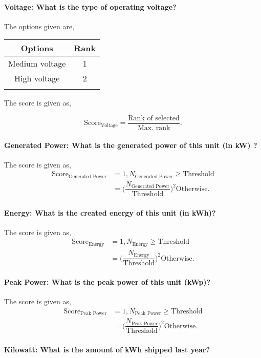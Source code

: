 \documentclass[oneside,twocolumn]{article}
\newcommand{\tsub}[2]{\text{#1}_{\text{#2}}}
\newcommand{\tsubb}[2]{#1_{\text{#2}}}
\newcommand{\dsub}[2]{\dfrac{\text{#1}}{\text{#2}}}
\newcommand{\singsel}[1]
{
	\[
		\tsub{Score}{#1} = \dsub{Rank of selected}{Max. rank}.
	\]
}
\newenvironment{ttable}
{
\begin{center}
\begin{tabular}{c|c}
\hline
}
{
\\ \hline
\end{tabular}
\end{center}
}
\begin{document}
\paragraph{Voltage: What is the type of operating voltage? }

The options given are,
\begin{ttable}
Options & Rank \\ \hline
Medium voltage & 1 \\
High voltage & 2 \\
\hline
\end{ttable}
The score is given as,
\singsel{Voltage}
\paragraph{Generated Power: What is the generated power of this unit (in kW) ?}

The score is given as,
\begin{align*}
\tsub{Score}{Generated Power} &= 1, \tsubb{N}{Generated Power} \ge \text{Threshold} \\
        &=
\Big(\dfrac{\tsubb{N}{Generated Power}}{\text{Threshold}}\Big)^{2}
\text{Otherwise}.
\end{align*}
\paragraph{Energy: What is the created energy of this unit (in kWh)?}

The score is given as,
\begin{align*}
\tsub{Score}{Energy} &= 1, \tsubb{N}{Energy} \ge \text{Threshold} \\
        &=
\Big(\dfrac{\tsubb{N}{Energy}}{\text{Threshold}}\Big)^{2}
\text{Otherwise}.
\end{align*}
\paragraph{Peak Power: What is the peak power of this unit (kWp)?}

The score is given as,
\begin{align*}
\tsub{Score}{Peak Power} &= 1, \tsubb{N}{Peak Power} \ge \text{Threshold} \\
        &=
\Big(\dfrac{\tsubb{N}{Peak Power}}{\text{Threshold}}\Big)^{2}
\text{Otherwise}.
\end{align*}
\paragraph{Kilowatt: What is the amount of kWh shipped last year?}
\end{document}
